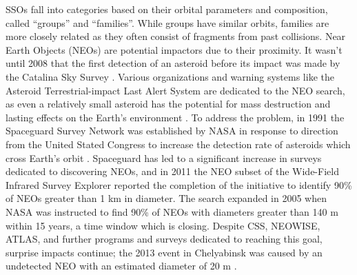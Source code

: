 \documentclass[twocolumn]{aastex62}
\begin{document}
SSOs fall into categories based on their orbital parameters and composition, called ``groups'' and ``families''.  While groups have similar orbits, families are more closely related as they often consist of fragments from past collisions. Near Earth Objects (NEOs) are potential impactors due to their proximity.  It wasn't until 2008 that the first detection of an asteroid before its impact was made by the Catalina Sky Survey \citep[CSS,][]{Kowalski08}.  Various organizations and warning systems like the Asteroid Terrestrial-impact Last Alert System \citep[ATLAS,][]{atlas} are dedicated to the NEO search, as even a relatively small asteroid has the potential for mass destruction \citep{dearborn20} and lasting effects on the Earth’s environment \citep{marchi19,koeberl19}.  To address the problem, in 1991 the Spaceguard Survey Network was established by NASA in response to direction from the United Stated Congress to increase the detection rate of asteroids which cross Earth's orbit \citep{Morrison}.  Spaceguard has led to a significant increase in surveys dedicated to discovering NEOs, and in 2011 the NEO subset of the Wide-Field Infrared Survey Explorer \citep[NEOWISE,][]{Mainzer} reported the completion of the initiative to identify 90\% of NEOs greater than 1 km in diameter.  The search expanded in 2005 when NASA was instructed to find 90\% of NEOs with diameters greater than 140 m within 15 years, a time window which is closing.  Despite CSS, NEOWISE, ATLAS,  and further programs and surveys dedicated to reaching this goal, surprise impacts continue; the 2013 event in Chelyabinsk was caused by an undetected NEO with an estimated diameter of 20 m \citep{popova13}.  
\end{document}
